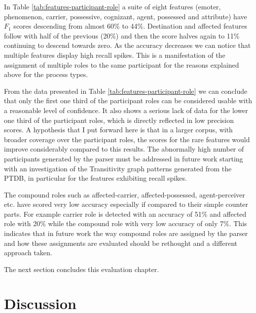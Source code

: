     In Table \ref{tab:features-participant-role} a suite of eight features (emoter, phenomenon, carrier, possessive, cognizant, agent, possessed and attribute) have $F_1$ scores descending from almost 60\% to 44\%. Destination and affected features follow with half of the previous (20\%) and then the score halves again to 11\% continuing to descend towards zero. As the accuracy decreases we can notice that multiple features display high recall spikes. This is a manifestation of the assignment of multiple roles to the same participant for the reasons explained above for the process types. 

    From the data presented in Table \ref{tab:features-participant-role} we can conclude that only the first one third of the participant roles can be considered usable with a reasonable level of confidence. It also shows a serious lack of data for the lower one third of the participant roles, which is directly reflected in low precision scores. A hypothesis that I put forward here is that in a larger corpus, with broader coverage over the participant roles, the scores for the rare features would improve considerably compared to this results. The abnormally high number of participants generated by the parser must be addressed in future work starting with an investigation of the Transitivity graph patterns generated from the PTDB, in particular for the features exhibiting recall spikes. 
    
    The compound roles such as affected-carrier, affected-possessed, agent-perceiver etc. have scored very low accuracy especially if compared to their simple counter parts. For example carrier role is detected with an accuracy of 51\% and affected role with  20\% while the compound role with very low accuracy of only 7\%. This indicates that in future work the way compound roles are assigned by the parser and how these assignments are evaluated should be rethought and a different approach taken.  
    
    The next section concludes this evaluation chapter.

\section{Discussion}
\label{sec:evaluation-discussion}
    